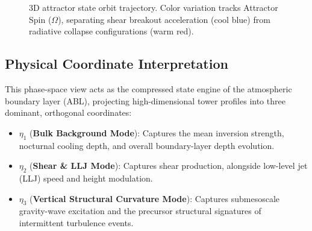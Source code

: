 \documentclass[11pt,a4paper]{article}
\begin{document}
\begin{figure}[htbp]
    \centering
    \caption{3D attractor state orbit trajectory. Color variation tracks Attractor Spin ($\Omega$), separating shear breakout acceleration (cool blue) from radiative collapse configurations (warm red).}
    \label{fig:attractor_GABLS3}
\end{figure}

\subsection{Physical Coordinate Interpretation}

This phase-space view acts as the compressed state engine of the atmospheric boundary layer (ABL), projecting high-dimensional tower profiles into three dominant, orthogonal coordinates:

\begin{itemize}
    \item $\eta_1$ (\textbf{Bulk Background Mode}): Captures the mean inversion strength, nocturnal cooling depth, and overall boundary-layer depth evolution.
    \item $\eta_2$ (\textbf{Shear \& LLJ Mode}): Captures shear production, alongside low-level jet (LLJ) speed and height modulation.
    \item $\eta_3$ (\textbf{Vertical Structural Curvature Mode}): Captures submesoscale gravity-wave excitation and the precursor structural signatures of intermittent turbulence events.
\end{itemize}
\end{document}
